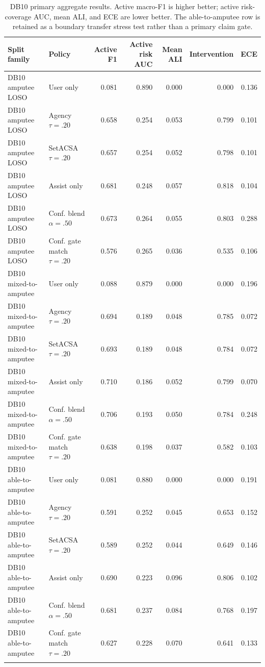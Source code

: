 \begin{table}[!t]
\centering
\caption{DB10 primary aggregate results. Active macro-F1 is higher better; active risk-coverage AUC, mean ALI, and ECE are lower better. The able-to-amputee row is retained as a boundary transfer stress test rather than a primary claim gate.}
\label{tab:db10-main}
\footnotesize
\begin{tabular}{llrrrrr}
\toprule
Split family & Policy & Active F1 & Active risk AUC & Mean ALI & Intervention & ECE \\
\midrule
DB10 amputee LOSO & User only & 0.081 & 0.890 & 0.000 & 0.000 & 0.136 \\
DB10 amputee LOSO & Agency $\tau=.20$ & 0.658 & 0.254 & 0.053 & 0.799 & 0.101 \\
DB10 amputee LOSO & SetACSA $\tau=.20$ & 0.657 & 0.254 & 0.052 & 0.798 & 0.101 \\
DB10 amputee LOSO & Assist only & 0.681 & 0.248 & 0.057 & 0.818 & 0.104 \\
DB10 amputee LOSO & Conf. blend $\alpha=.50$ & 0.673 & 0.264 & 0.055 & 0.803 & 0.288 \\
DB10 amputee LOSO & Conf. gate match $\tau=.20$ & 0.576 & 0.265 & 0.036 & 0.535 & 0.106 \\
\addlinespace
DB10 mixed-to-amputee & User only & 0.088 & 0.879 & 0.000 & 0.000 & 0.196 \\
DB10 mixed-to-amputee & Agency $\tau=.20$ & 0.694 & 0.189 & 0.048 & 0.785 & 0.072 \\
DB10 mixed-to-amputee & SetACSA $\tau=.20$ & 0.693 & 0.189 & 0.048 & 0.784 & 0.072 \\
DB10 mixed-to-amputee & Assist only & 0.710 & 0.186 & 0.052 & 0.799 & 0.070 \\
DB10 mixed-to-amputee & Conf. blend $\alpha=.50$ & 0.706 & 0.193 & 0.050 & 0.784 & 0.248 \\
DB10 mixed-to-amputee & Conf. gate match $\tau=.20$ & 0.638 & 0.198 & 0.037 & 0.582 & 0.103 \\
\addlinespace
DB10 able-to-amputee & User only & 0.081 & 0.880 & 0.000 & 0.000 & 0.191 \\
DB10 able-to-amputee & Agency $\tau=.20$ & 0.591 & 0.252 & 0.045 & 0.653 & 0.152 \\
DB10 able-to-amputee & SetACSA $\tau=.20$ & 0.589 & 0.252 & 0.044 & 0.649 & 0.146 \\
DB10 able-to-amputee & Assist only & 0.690 & 0.223 & 0.096 & 0.806 & 0.102 \\
DB10 able-to-amputee & Conf. blend $\alpha=.50$ & 0.681 & 0.237 & 0.084 & 0.768 & 0.197 \\
DB10 able-to-amputee & Conf. gate match $\tau=.20$ & 0.627 & 0.228 & 0.070 & 0.641 & 0.133 \\
\addlinespace
\bottomrule
\end{tabular}
\end{table}

